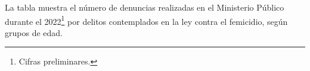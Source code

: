 La tabla muestra el número de denuncias realizadas en el Ministerio Público durante el 2022\footnote{Cifras preliminares.} por delitos contemplados en la ley contra el femicidio, según grupos de edad. 